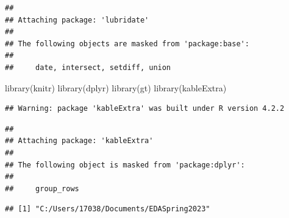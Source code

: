 \documentclass[
]{article}
\newenvironment{Shaded}{\begin{snugshade}}{\end{snugshade}}
\newcommand{\AttributeTok}[1]{\textcolor[rgb]{0.77,0.63,0.00}{#1}}
\newcommand{\ConstantTok}[1]{\textcolor[rgb]{0.00,0.00,0.00}{#1}}
\newcommand{\DecValTok}[1]{\textcolor[rgb]{0.00,0.00,0.81}{#1}}
\newcommand{\FunctionTok}[1]{\textcolor[rgb]{0.00,0.00,0.00}{#1}}
\newcommand{\NormalTok}[1]{#1}
\newcommand{\SpecialCharTok}[1]{\textcolor[rgb]{0.00,0.00,0.00}{#1}}
\begin{document}
\begin{verbatim}
## 
## Attaching package: 'lubridate'
## 
## The following objects are masked from 'package:base':
## 
##     date, intersect, setdiff, union
\end{verbatim}

\begin{Shaded}
\begin{Highlighting}[]
\FunctionTok{library}\NormalTok{(knitr)}
\FunctionTok{library}\NormalTok{(dplyr)}
\FunctionTok{library}\NormalTok{(gt)}
\FunctionTok{library}\NormalTok{(kableExtra)}
\end{Highlighting}
\end{Shaded}

\begin{verbatim}
## Warning: package 'kableExtra' was built under R version 4.2.2
\end{verbatim}

\begin{verbatim}
## 
## Attaching package: 'kableExtra'
## 
## The following object is masked from 'package:dplyr':
## 
##     group_rows
\end{verbatim}

\begin{Shaded}
\end{Shaded}

\begin{verbatim}
## [1] "C:/Users/17038/Documents/EDASpring2023"
\end{verbatim}
\end{document}
